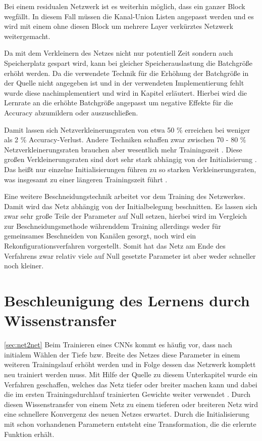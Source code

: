 Bei einem residualen Netzwerk ist es weiterhin möglich, dass ein ganzer Block wegfällt. In diesem Fall müssen die Kanal-Union Listen angepasst werden und es wird mit einem ohne diesen Block um mehrere Layer verkürztes Netzwerk weitergemacht.


Da mit dem Verkleinern des Netzes nicht nur potentiell Zeit sondern auch Speicherplatz gespart wird, kann bei gleicher Speicherauslastung die Batchgröße erhöht werden. Da die verwendete Technik für die Erhöhung der Batchgröße in der Quelle nicht angegeben ist und in der verwendeten Implementierung  fehlt wurde diese nachimplementiert und wird in Kapitel  erläutert. Hierbei wird die Lernrate an die erhöhte Batchgröße angepasst um negative Effekte für die Accuracy abzumildern oder auszuschließen. 

Damit lassen sich Netzverkleinerungsraten von etwa 50 \% erreichen bei weniger als 2 \% Accuracy-Verlust. Andere Techniken schaffen zwar zwischen 70 - 80 \% Netzverkleinerungsraten brauchen aber wesentlich mehr Trainingszeit \cite{lottery}. Diese großen Verkleinerungsraten sind dort sehr stark abhängig von der Initialisierung \cite{lottery}. Das heißt nur einzelne Initialisierungen führen zu so starken Verkleinerungsraten, was insgesamt zu einer längeren Trainingszeit führt \cite{lottery}. 


Eine weitere Beschneidungstechnik arbeitet vor dem Training des Netzwerkes\cite{snyc}. Damit wird das Netz abhängig von der Initialbelegung beschnitten. Es lassen sich zwar sehr große Teile der Parameter auf Null setzen, hierbei wird im Vergleich zur Beschneidungsmethode währenddem Training allerdings weder für gemeinsames Beschneiden von Kanälen gesorgt, noch wird ein Rekonfigurationsverfahren vorgestellt. Somit hat das Netz am Ende des Verfahrens zwar relativ viele auf Null gesetzte Parameter ist aber weder schneller noch kleiner.


\section{Beschleunigung des Lernens durch Wissenstransfer}
\ref{sec:net2net}
Beim Trainieren eines CNNs kommt es häufig vor, dass nach initialem Wählen der Tiefe bzw. Breite des Netzes diese Parameter in einem weiteren Trainingslauf erhöht werden und in Folge dessen das Netzwerk komplett neu trainiert werden muss. Mit Hilfe der Quelle zu diesem Unterkapitel wurde ein Verfahren geschaffen, welches das Netz tiefer oder breiter machen kann und dabei die im ersten Trainingsdurchlauf trainierten Gewichte weiter verwendet \cite{net2net}. Durch diesen Wissenstransfer von einem Netz zu einem tieferen oder breiteren Netz wird eine schnellere Konvergenz des neuen Netzes erwartet. Durch die Initialisierung mit schon vorhandenen Parametern entsteht eine Transformation, die die erlernte Funktion erhält.

